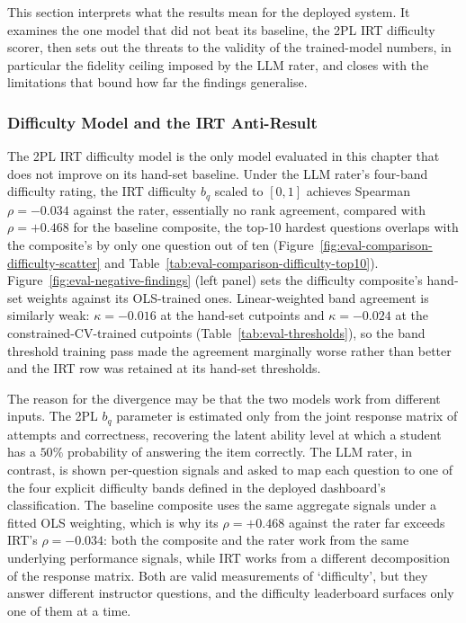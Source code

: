This section interprets what the results mean for the deployed system. It examines the one model that did not beat its baseline, the 2PL IRT difficulty scorer, then sets out the  threats to the validity of the trained-model numbers, in particular the fidelity ceiling imposed by the LLM rater, and closes with the limitations that bound how far the findings generalise.



\subsubsection{Difficulty Model and the IRT Anti-Result} \label{sec:eval-irt}

The 2PL IRT difficulty model is the only model evaluated in this chapter that does not improve on its hand-set baseline. Under the LLM rater's four-band difficulty rating, the IRT difficulty $b_q$ scaled to $[0, 1]$ achieves Spearman $\rho = -0.034$ against the rater, essentially no rank agreement, compared with $\rho = +0.468$ for the baseline composite, the top-10 hardest questions overlaps with the composite's by only one question out of ten (Figure~\ref{fig:eval-comparison-difficulty-scatter} and Table~\ref{tab:eval-comparison-difficulty-top10}). Figure~\ref{fig:eval-negative-findings} (left panel) sets the difficulty composite's hand-set weights against its OLS-trained ones. Linear-weighted band agreement is similarly weak: $\kappa = -0.016$ at the hand-set cutpoints and $\kappa = -0.024$ at the constrained-CV-trained cutpoints (Table~\ref{tab:eval-thresholds}), so the band threshold training pass made the agreement marginally worse rather than better and the IRT row was retained at its hand-set thresholds.

The reason for the divergence may be that the two models work from different inputs. The 2PL $b_q$ parameter is estimated only from the joint response matrix of attempts and correctness, recovering the latent ability level at which a student has a $50\%$ probability of answering the item correctly. The LLM rater, in contrast, is shown per-question signals and asked to map each question to one of the four explicit difficulty bands defined in the deployed dashboard's classification. The baseline composite uses the same aggregate signals under a fitted OLS weighting, which is why its $\rho = +0.468$ against the rater far exceeds IRT's $\rho = -0.034$: both the composite and the rater work from the same underlying performance signals, while IRT works from a different decomposition of the response matrix. Both are valid measurements of `difficulty', but they answer different instructor questions, and the difficulty leaderboard surfaces only one of them at a time.

